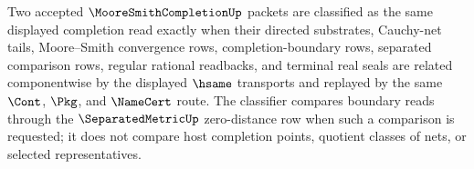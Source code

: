 \begin{definition}
\label{def:moore-smith-completion-classifier}
Two accepted $\MooreSmithCompletionUp$ packets are classified as the same displayed completion read exactly when their directed substrates, Cauchy-net tails, Moore--Smith convergence rows, completion-boundary rows, separated comparison rows, regular rational readbacks, and terminal real seals are related componentwise by the displayed $\hsame$ transports and replayed by the same $\Cont$, $\Pkg$, and $\NameCert$ route. The classifier compares boundary reads through the $\SeparatedMetricUp$ zero-distance row when such a comparison is requested; it does not compare host completion points, quotient classes of nets, or selected representatives.
\end{definition}

